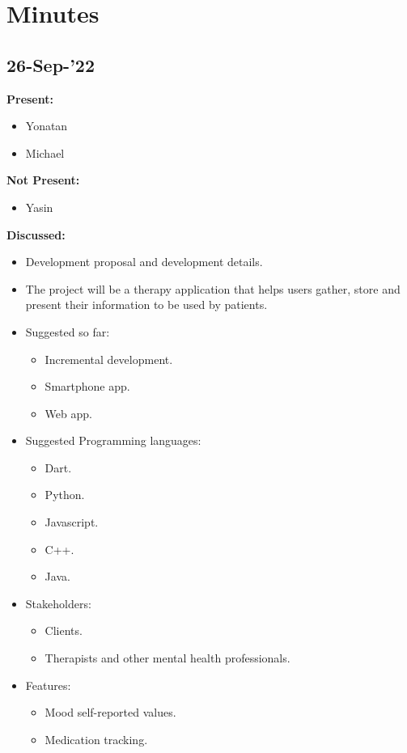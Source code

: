 \documentclass[11pt]{article}
\begin{document}
    \section{Minutes}

    \subsection{26-Sep-’22}\label{subsec:26-sep-22}

    \textbf{Present:}
    \begin{itemize}
        \item Yonatan
        \item Michael
    \end{itemize}

    \textbf{Not Present:}

    \begin{itemize}
        \item Yasin
    \end{itemize}

    \textbf{Discussed:}

    \begin{itemize}
        \item  Development proposal and development details.
        \item  The project will be a therapy application that helps users gather, store and present their information to be used by patients.
        \item Suggested so far:
        \begin{itemize}
            \item Incremental development.
            \item Smartphone app.
            \item Web app.
        \end{itemize}
        \item  Suggested Programming languages:
        \begin{itemize}
            \item Dart.
            \item Python.
            \item Javascript.
            \item C++.
            \item Java.
        \end{itemize}
        \item Stakeholders:
        \begin{itemize}
            \item Clients.
            \item Therapists and other mental health professionals.
        \end{itemize}
        \item Features:
        \begin{itemize}
            \item Mood self-reported values.
            \item Medication tracking.
        \end{itemize}

    \end{itemize}
\end{document}
